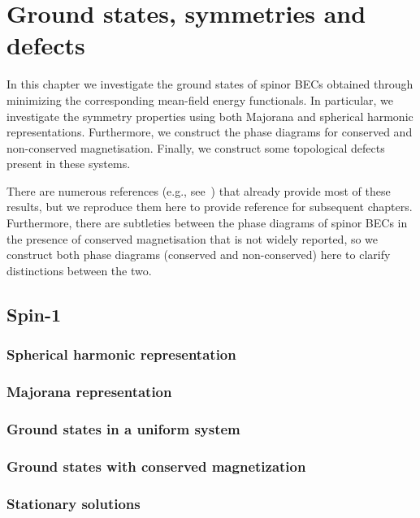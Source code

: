 \chapter{Ground states, symmetries and defects}
In this chapter we investigate the ground states of spinor BECs obtained through
minimizing the corresponding mean-field energy functionals.
In particular, we investigate the symmetry properties using both Majorana and
spherical harmonic representations.
Furthermore, we construct the phase diagrams for conserved and non-conserved
magnetisation.
Finally, we construct some topological defects present in these systems.

There are numerous references (e.g., see~\cite{Ciobanu2000, Zhang2003,
Kawaguchi2012, StamperKurn2013}) that already provide most of these results,
but we reproduce them here to provide reference for subsequent chapters.
Furthermore, there are subtleties between the phase diagrams of spinor BECs
in the presence of conserved magnetisation that is not widely reported, so we
construct both phase diagrams (conserved and non-conserved) here to clarify
distinctions between the two.


\section{Spin-1}

\subsection{Spherical harmonic representation}

\subsection{Majorana representation}

\subsection{Ground states in a uniform system}

\subsection{Ground states with conserved magnetization}

\subsection{Stationary solutions}

